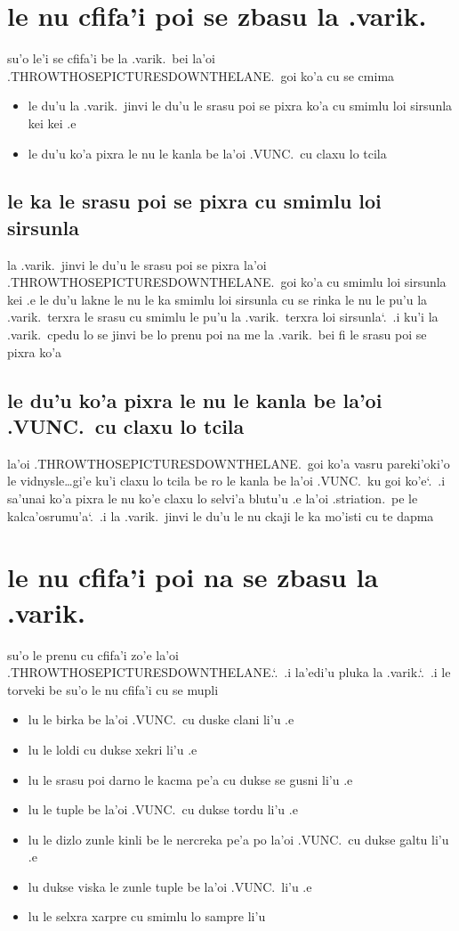 \documentclass{report}
\newcommand\sds{\spacefactor\sfcode`.\ \space}
\begin{document}
\section{le nu cfifa'i poi se zbasu la .varik.}
su'o le'i se cfifa'i be la .varik.\ bei la'oi .THROWTHOSEPICTURESDOWNTHELANE.\ goi ko'a cu se cmima
\begin{itemize}
	\item le du'u la .varik.\ jinvi le du'u le srasu poi se pixra ko'a cu smimlu loi sirsunla kei kei .e
	\item le du'u ko'a pixra le nu le kanla be la'oi .VUNC.\ cu claxu lo tcila
\end{itemize}

\subsection{le ka le srasu poi se pixra cu smimlu loi sirsunla}
la .varik.\ jinvi le du'u le srasu poi se pixra la'oi .THROWTHOSEPICTURESDOWNTHELANE.\ goi ko'a cu smimlu loi sirsunla kei .e le du'u lakne le nu le ka smimlu loi sirsunla cu se rinka le nu le pu'u la .varik.\ terxra le srasu cu smimlu le pu'u la .varik.\ terxra loi sirsunla\sds  .i ku'i la .varik.\ cpedu lo se jinvi be lo prenu poi na me la .varik.\ bei fi le srasu poi se pixra ko'a

\subsection{le du'u ko'a pixra le nu le kanla be la'oi .VUNC.\ cu claxu lo tcila}
la'oi .THROWTHOSEPICTURESDOWNTHELANE.\ goi ko'a vasru pareki'oki'o le vidnysle\ldots gi'e ku'i claxu lo tcila be ro le kanla be la'oi .VUNC.\ ku goi ko'e\sds  .i sa'unai ko'a pixra le nu ko'e claxu lo selvi'a blutu'u .e la'oi .striation.\ pe le kalca'osrumu'a\sds  .i la .varik.\ jinvi le du'u le nu ckaji le ka mo'isti cu te dapma

\section{le nu cfifa'i poi na se zbasu la .varik.}
su'o le prenu cu cfifa'i zo'e la'oi .THROWTHOSEPICTURESDOWNTHELANE.\sds  .i la'edi'u pluka la .varik.\sds  .i le torveki be su'o le nu cfifa'i cu se mupli
\begin{itemize}
	\item lu le birka be la'oi .VUNC.\ cu duske clani li'u .e
	\item lu le loldi cu dukse xekri li'u .e
	\item lu le srasu poi darno le kacma pe'a cu dukse se gusni li'u .e
	\item lu le tuple be la'oi .VUNC.\ cu dukse tordu li'u .e
	\item lu le dizlo zunle kinli be le nercreka pe'a po la'oi .VUNC.\ cu dukse galtu li'u .e
	\item lu dukse viska le zunle tuple be la'oi .VUNC.\ li'u .e
	\item lu le selxra xarpre cu smimlu lo sampre li'u
\end{itemize}
\end{document}
